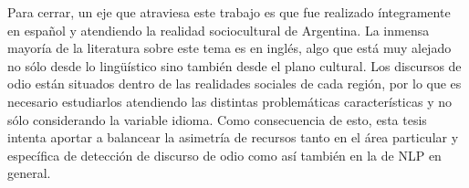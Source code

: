 Para cerrar, un eje que atraviesa este trabajo es que fue realizado íntegramente en español y atendiendo la realidad sociocultural de Argentina. La inmensa mayoría de la literatura sobre este tema es en inglés, algo que está muy alejado no sólo desde lo lingüístico sino también desde el plano cultural. Los discursos de odio están situados dentro de las realidades sociales de cada región, por lo que es necesario estudiarlos atendiendo las distintas problemáticas características y no sólo considerando la variable idioma. Como consecuencia de esto, esta tesis intenta aportar a balancear la asimetría de recursos tanto en el área particular y específica de detección de discurso de odio como así también en la de NLP en general.